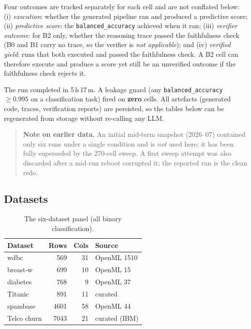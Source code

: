 Four outcomes are tracked separately for each cell and are not
conflated below: (i) \emph{execution}: whether the generated pipeline
ran and produced a predictive score; (ii) \emph{predictive score}:
the \texttt{balanced\_accuracy} achieved when it ran; (iii)
\emph{verifier outcome}: for B2 only, whether the reasoning trace
passed the faithfulness check (B0 and B1 carry no trace, so the
verifier is \emph{not applicable}); and (iv) \emph{verified yield}:
runs that both executed and passed the faithfulness check. A B2 cell
can therefore execute and produce a score yet still be an unverified
outcome if the faithfulness check rejects it.

The run completed in 5\,h\,17\,m. A leakage guard (any
\texttt{balanced\_accuracy} $\geq 0.995$ on a classification task)
fired on \textbf{zero} cells. All artefacts (generated code, traces,
verification reports) are persisted, so the tables below can be
regenerated from storage without re-calling any LLM.

\begin{quote}
\textbf{Note on earlier data.} An initial mid-term snapshot
(2026--07) contained only six runs under a single condition and is
\emph{not} used here; it has been fully superseded by the 270-cell
sweep. A first sweep attempt was also discarded after a mid-run
reboot corrupted it; the reported run is the clean redo.
\end{quote}

\subsection{Datasets}

\begin{table}[H]
\centering
\caption{The six-dataset panel (all binary classification).}
\label{tab:datasets}
\small
\renewcommand{\arraystretch}{1.2}
\begin{tabular}{l r r l}
\toprule
\textbf{Dataset} & \textbf{Rows} & \textbf{Cols} & \textbf{Source} \\
\midrule
wdbc        & 569  & 31 & OpenML 1510 \\
breast-w    & 699  & 10 & OpenML 15 \\
diabetes    & 768  & 9  & OpenML 37 \\
Titanic     & 891  & 11 & curated \\
spambase    & 4601 & 58 & OpenML 44 \\
Telco churn & 7043 & 21 & curated (IBM) \\
\bottomrule
\end{tabular}
\end{table}

